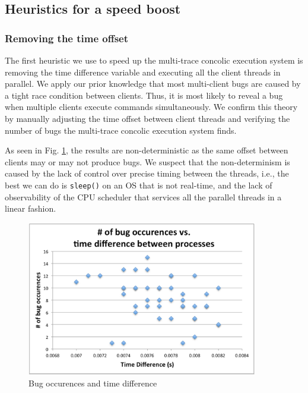 \documentclass{llncs}
\begin{document}
\subsection{Heuristics for a speed boost}

\subsubsection{Removing the time offset}

The first heuristic we use to speed up the multi-trace concolic
execution system is removing the time difference variable and
executing all the client threads in parallel. We apply our prior
knowledge that most multi-client bugs are caused by a tight race
condition between clients. Thus, it is most likely to reveal a bug
when multiple clients execute commands simultaneously. We confirm this
theory by manually adjusting the time offset between client threads
and verifying the number of bugs the multi-trace concolic execution
system finds.

As seen in Fig. \ref{fig:error}, the results are non-deterministic as
the same offset between clients may or may not produce bugs. We
suspect that the non-determinism is caused by the lack of control over
precise timing between the threads, i.e., the best we can do is
\texttt{sleep()} on an OS that is not real-time, and the lack of
observability of the CPU scheduler that services all the parallel
threads in a linear fashion.

\begin{figure}
  \begin{center}
    \includegraphics[width=0.9\textwidth]{graph.png}
  \end{center}
  \caption{Bug occurences and time difference}
  \label{fig:error}
\end{figure}
\end{document}
